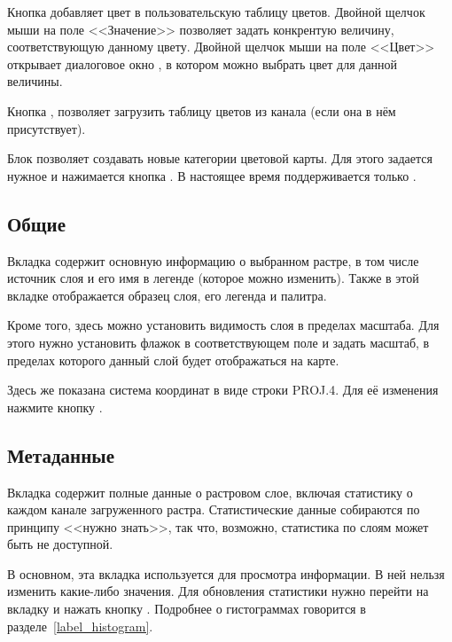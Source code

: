 Кнопка  добавляет цвет в пользовательскую таблицу
цветов. Двойной щелчок мыши на поле <<Значение>>
позволяет задать конкрентую величину, соответствующую данному цвету. Двойной щелчок
мыши на поле <<Цвет>> открывает диалоговое окно , в котором
можно выбрать цвет для данной величины.

Кнопка ,
позволяет загрузить таблицу цветов из канала (если она в нём присутствует).

Блок  позволяет создавать
новые категории цветовой карты. Для этого задается нужное
 и нажимается кнопка
. В настоящее время поддерживается только
.

\subsection{Общие}\label{label_generaltab}

Вкладка  содержит основную информацию о выбранном растре,
в том числе источник слоя и его имя в легенде (которое можно изменить).
Также в этой вкладке отображается образец слоя, его легенда и палитра.

Кроме того, здесь можно установить видимость слоя в пределах
масштаба. Для этого нужно установить флажок в соответствующем поле и
задать масштаб, в пределах которого данный слой будет отображаться на
карте.

Здесь же показана система координат в виде строки PROJ.4. Для её изменения
нажмите кнопку .

\subsection{Метаданные}\label{label_metatab}

Вкладка  содержит полные данные о растровом слое,
включая статистику о каждом канале загруженного растра. Статистические
данные собираются по принципу <<нужно знать>>, так что, возможно,
статистика по слоям может быть не доступной.

В основном, эта вкладка используется для просмотра информации. В ней
нельзя изменить какие-либо значения. Для обновления статистики нужно
перейти на вкладку  и нажать кнопку .
Подробнее о гистограммах говорится в разделе~\ref{label_histogram}.

